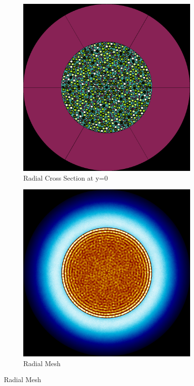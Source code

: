 \begin{figure}[H]
\centering

\begin{subfigure}{0.45\textwidth}
  \includegraphics[width=0.95\linewidth]{figures/300-360/300-360-r}
  \caption{Radial Cross Section at y=0}
  \label{fig:300-360-r}
\end{subfigure}%
%
\begin{subfigure}{0.45\textwidth}
  \includegraphics[width=0.95\linewidth]{figures/300-360/300-360-rm}
  \caption{Radial Mesh}
  \label{fig:300-360-rm}
\end{subfigure}


\end{figure}
